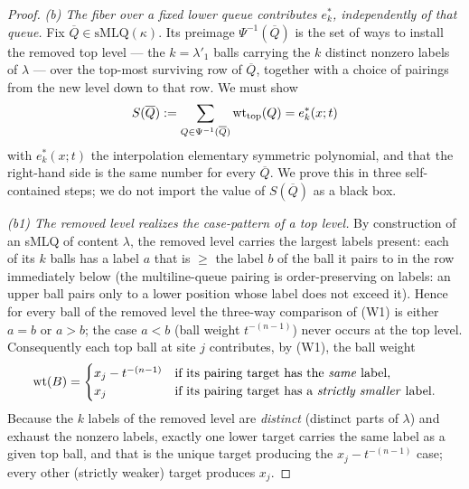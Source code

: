\begin{proof}
\emph{(b) The fiber over a fixed lower queue contributes $e^*_k$, independently of
that queue.} Fix $\overline Q\in\mathrm{sMLQ}(\kappa)$. Its preimage
$\Psi^{-1}(\overline Q)$ is the set of ways to install the removed top level --- the
$k=\lambda'_1$ balls carrying the $k$ distinct nonzero labels of $\lambda$ --- over
the top-most surviving row of $\overline Q$, together with a choice of pairings from
the new level down to that row. We must show
\begin{equation}\label{eq:fibertop}
S(\overline Q):=\sum_{Q\in\Psi^{-1}(\overline Q)}\operatorname{wt}_{\mathrm{top}}(Q)=e^*_k(x;t)
\end{equation}
with $e^*_k(x;t)$ the interpolation elementary symmetric polynomial, and that the
right-hand side is the same number for every $\overline Q$. We prove this in three
self-contained steps; we do not import the value of $S(\overline Q)$ as a black box.

\emph{(b1) The removed level realizes the case-pattern of a top level.} By
construction of an sMLQ of content $\lambda$, the removed level carries the largest
labels present: each of its $k$ balls has a label $a$ that is $\ge$ the label $b$ of
the ball it pairs to in the row immediately below (the multiline-queue pairing is
order-preserving on labels: an upper ball pairs only to a lower position whose label
does not exceed it). Hence for every ball of the removed level the three-way
comparison of (W1) is either $a=b$ or $a>b$; the case $a<b$ (ball weight
$t^{-(n-1)}$) never occurs at the top level. Consequently each top ball at site $j$
contributes, by (W1), the ball weight
\[
\operatorname{wt}(B)=\begin{cases}x_j-t^{-(n-1)}&\text{if its pairing target has the \emph{same} label},\\ x_j&\text{if its pairing target has a \emph{strictly smaller} label}.\end{cases}
\]
Because the $k$ labels of the removed level are \emph{distinct} (distinct parts of
$\lambda$) and exhaust the nonzero labels, exactly one lower target carries the same
label as a given top ball, and that is the unique target producing the $x_j-t^{-(n-1)}$
case; every other (strictly weaker) target produces $x_j$.


\end{proof}

